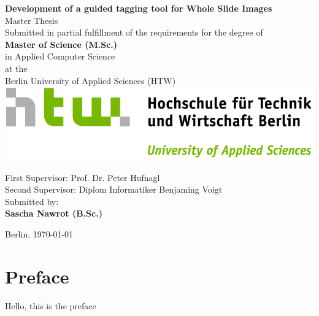 \documentclass{report}
\begin{document}
\begin{titlepage}
	\centering
	{\huge\textbf{Development of a guided tagging tool for Whole Slide Images\\}}
	\vspace{1cm}
	{\huge Master Thesis\\}
	\vspace{2cm}
	{\large Submitted in partial fulfillment of the requirements for the degree
	of\\}
	\vspace{0.5cm}
	{\large \textbf{Master of Science (M.Sc.)}\\ 
	in Applied Computer Science\\}
	\vspace{0.5cm}
	{\large at the\\}
	\vspace{0.5cm}
	{\large Berlin University of Applied Sciences (HTW)\\}
	\vspace{0.5cm}
	\includegraphics[scale=1]{img/HTW_Logo_quer_rgb.jpg}
	\\
	\vspace{1cm}
	\raggedright
	{\large First Supervisor: Prof. Dr. Peter Hufnagl\\}
	\vspace{0.25cm}
	{\large Second Supervisor: Diplom Informatiker Benjaming Voigt\\}
	\centering
	\vspace{1.5cm}
	{\large Submitted by: \\}
	\vspace{0.25cm}
	{\large \textbf{Sascha Nawrot (B.Sc.)}}
	\vfill
		{\large Berlin, \today{}\par}
\end{titlepage}

\newpage
\chapter*{Preface}
Hello, this is the preface

\newpage
\begin{abstract}
This is the abstract.
\end{abstract}
\newpage
\end{document}
